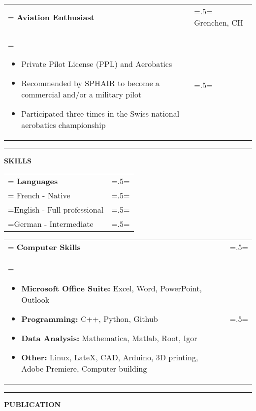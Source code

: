 \documentclass[letterpaper, 11pt]{article}
\begin{document}
\begin{tabularx}{1.0\textwidth} { 
   >{\raggedright\arraybackslash\hsize=1.5\hsize\linewidth=\hsize}X 
   >{\raggedleft\arraybackslash\hsize=.5\hsize\linewidth=\hsize}X }
\normalsize
\bf{Aviation Enthusiast} & Grenchen, CH\\
\normalfont \begin{itemize}[leftmargin=*,noitemsep,topsep=0pt]
\item Private Pilot License (PPL) and Aerobatics
\item Recommended by SPHAIR to become a commercial and/or a military pilot
\item Participated three times in the Swiss national aerobatics championship
\end{itemize} & 2014
\end{tabularx}


\begin{center}
\noindent\rule{0.75\textwidth}{1pt}
\end{center}

\begin{center}
\large\bf{SKILLS}
\end{center}

\begin{tabularx}{1.0\textwidth} { 
   >{\raggedright\arraybackslash\hsize=1.5\hsize\linewidth=\hsize}X 
   >{\raggedleft\arraybackslash\hsize=.5\hsize\linewidth=\hsize}X }
\normalsize
\bf{Languages} & \\
\normalfont
French - Native & \\
English - Full professional & \\
German - Intermediate 
\end{tabularx}
\vspace{0.25cm}

\begin{tabularx}{1.0\textwidth} { 
   >{\raggedright\arraybackslash\hsize=1.5\hsize\linewidth=\hsize}X 
   >{\raggedleft\arraybackslash\hsize=.5\hsize\linewidth=\hsize}X }
\normalsize
\bf{Computer Skills} & \\
\normalfont \begin{itemize}[leftmargin=*,noitemsep,topsep=0pt]
\item \textbf{Microsoft Office Suite:}  Excel, Word, PowerPoint, Outlook
\item \textbf{Programming:} C++, Python, Github
\item \textbf{Data Analysis:} Mathematica, Matlab, Root, Igor
\item \textbf{Other:} Linux, LateX, CAD, Arduino, 3D printing, Adobe Premiere, Computer building
\end{itemize} & 
\end{tabularx}

\begin{center}
\noindent\rule{0.75\textwidth}{1pt}
\end{center}

\begin{center}
\large\bf{PUBLICATION}
\end{center}

\nocite{*}

\printbibliography[title=\normalsize Master Thesis]

\end{document}
